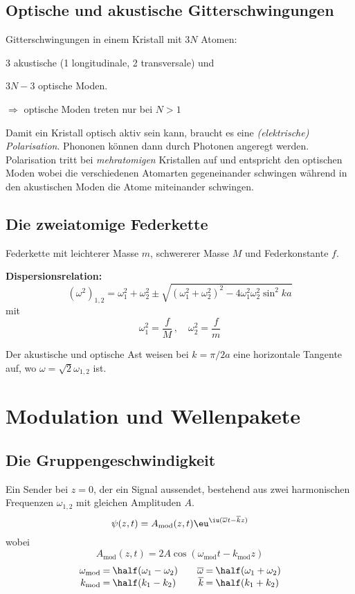 	\subsection{Optische und akustische Gitterschwingungen} %
		Gitterschwingungen in einem Kristall mit $3N$ Atomen:
		\begin{tightitemize}
			\item $3$ akustische (1 longitudinale, 2 transversale) und
			\item $3N - 3$ optische Moden.
			\item[$\Rightarrow$] optische Moden treten nur bei $N > 1$
		\end{tightitemize}

		Damit ein Kristall optisch aktiv sein kann, braucht es eine
		\emph{(elektrische) Polarisation}. Phononen können dann durch Photonen
		angeregt werden. Polarisation tritt bei \emph{mehratomigen} Kristallen auf
		und entspricht den optischen Moden wobei die verschiedenen Atomarten
		gegeneinander schwingen während in den akustischen Moden die Atome
		miteinander schwingen.
	\subsection{Die zweiatomige Federkette} %
		Federkette mit leichterer Masse $m$, schwererer Masse $M$ und Federkonstante $f$.
		
		\textbf{Dispersionsrelation:}
		\[
			(\omega^2)_{1,2} = \omega_1^2 + \omega_2^2 \pm \sqrt{(\omega_1^2 + \omega_2^2)^2 - 4\omega_1^2 \omega_2^2 \sin^2 ka}
		\]
		mit
		\[
			\omega_1^2 = \frac f M \,,\quad \omega_2^2 = \frac f m
		\]
		
		Der akustische und optische Ast weisen bei $k = \pi/2a$ eine horizontale Tangente auf, wo $\omega = \sqrt{2} \omega_{1,2}$ ist.
\section{Modulation und Wellenpakete} %
	\subsection{Die Gruppengeschwindigkeit} %
		Ein Sender bei $z = 0$, der ein Signal aussendet, bestehend aus zwei harmonischen Frequenzen $\omega_{1,2}$ mit gleichen Amplituden $A$.
		\[
			\psi(z,t) = A_\text{mod}(z,t) \eu^{\iu (\overline\omega t - \overline k z)}
		\]
		wobei
		\[
			A_\text{mod}(z,t) = 2A \cos(\omega_\text{mod} t - k_\text{mod} z)
		\]
		\[
			\begin{array}{r@{\:=\:}l@{\qquad}r@{\:=\:}l}
				\omega_\text{mod} & \half (\omega_1 - \omega_2) &
				\overline\omega & \half (\omega_1 + \omega_2) \\
				k_\text{mod} & \half (k_1 - k_2) &
				\overline k & \half (k_1 + k_2)
			\end{array}
		\]
		
